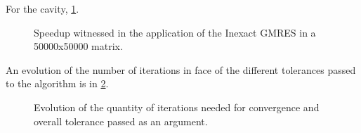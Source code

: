For the cavity, \ref{fig:cavity_results}.

\begin{figure}[h!]
    \centering
    
    \caption{Speedup witnessed in the application of the Inexact GMRES in a 50000x50000 matrix.}
    \label{fig:cavity_results}
\end{figure}

An evolution of the number of iterations in face of the different tolerances passed to the algorithm is in \ref{fig:cavity_iterations}.

\begin{figure}[h!]
    \centering
    
    \caption{Evolution of the quantity of iterations needed for convergence and overall tolerance passed as an argument.}
    \label{fig:cavity_iterations}
\end{figure}